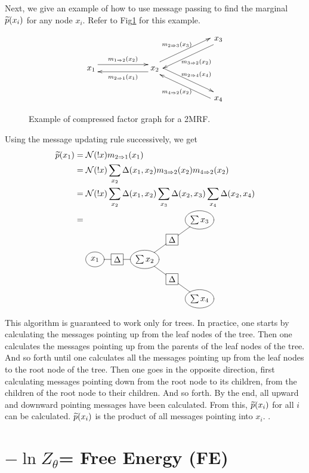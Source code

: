Next, we give an 
example
of how to use message 
passing
to find
the marginal ${\widetilde{p}}(x_i)$
for any node $x_i$. Refer to
Fig\ref{fig-mp-3node-example}
for this example.

\begin{figure}[h!]
$$\xymatrix@C=5pc{
&&x_3\ar@<1ex>[ld]^{m_{3\rdart 2}(x_2)}
\\
x_1\ar@<1ex>[r]^{m_{1\rdart 2}(x_2)}
&x_2\ar@<1ex>[l]^{m_{2\rdart 1}(x_1)}
\ar@<1ex>[ru]^{m_{2\rdart 3}(x_3)}
\ar@<1ex>[rd]^{m_{2\rdart 4}(x_4)}
\\
&&x_4\ar@<1ex>[lu]^{m_{4\rdart 2}(x_2)}
}$$
\caption{
Example of compressed factor graph 
for a 2MRF.}
\label{fig-mp-3node-example}
\end{figure}

Using the message
updating rule
successively, we get
\begin{align}
\tP(x_1)
&=
\caln(!x)m_{2\rdart 1}(x_1)
\\
&=
\caln(!x)
\sum_{x_2}
\Delta(x_1,x_2)
m_{3\rdart 2}(x_2)
m_{4\rdart 2}(x_2)
\\
&=
\caln(!x)
\sum_{x_2}
\Delta(x_1,x_2)
\sum_{x_3}
\Delta(x_2,x_3)
\sum_{x_4}
\Delta(x_2, x_4)
\\
&=
\xymatrix@R=.5pc@C=.7pc{
&&&&
*++[o][F]{\sum x_3}
\\
&&&
*+[F]{\Delta}\ar@{-}[ru]
\\
*++[o][F]{x_1}\ar@{-}[r]
&*+[F]{\Delta}\ar@{-}[r]
&*++[o][F]{\sum x_2}
\ar@{-}[ru]\ar@{-}[rd]
\\
&&&*+[F]{\Delta}\ar@{-}[rd]
\\
&&&&
*++[o][F]{\sum x_4}
}
\end{align}

This 
algorithm
is guaranteed to work
only for trees. In practice,
one starts by calculating the 
messages pointing up from
the leaf nodes
of the tree. Then one calculates
the messages pointing up from the parents 
of the leaf nodes of the tree.
And so forth until
one calculates
all the messages 
pointing up from the leaf nodes
to the root node
of the tree.
Then one goes in the opposite
direction, first calculating
messages pointing down from the 
root node to its children, from the
children  of the root node 
to their children. And so forth.
By the end, 
all upward and downward
pointing 
messages have been calculated.
From this, ${\widetilde{p}}(x_i)$
for all $i$ can be calculated.
${\widetilde{p}}(x_i)$
is the product of all
messages pointing into $x_i$.
.


\section{ $-\ln Z_\theta$=
Free Energy (FE)}


